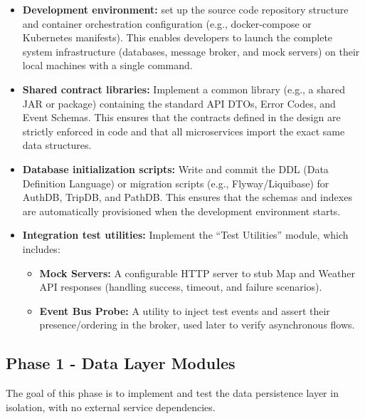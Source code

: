 \begin{itemize}
    \item \textbf{Development environment:} set up the source code repository structure and container orchestration configuration (e.g., docker-compose or Kubernetes manifests). This enables developers to launch the complete system infrastructure (databases, message broker, and mock servers) on their local machines with a single command.
    
    \item \textbf{Shared contract libraries:} Implement a common library (e.g., a shared JAR or package) containing the standard API DTOs, Error Codes, and Event Schemas. This ensures that the contracts defined in the design are strictly enforced in code and that all microservices import the exact same data structures.
    
    \item \textbf{Database initialization scripts:} Write and commit the DDL (Data Definition Language) or migration scripts (e.g., Flyway/Liquibase) for AuthDB, TripDB, and PathDB. This ensures that the schemas and indexes are automatically provisioned when the development environment starts.
    
    \item \textbf{Integration test utilities:} Implement the ``Test Utilities'' module, which includes:
    \begin{itemize}
        \item \textbf{Mock Servers:} A configurable HTTP server to stub Map and Weather API responses (handling success, timeout, and failure scenarios).
        \item \textbf{Event Bus Probe:} A utility to inject test events and assert their presence/ordering in the broker, used later to verify asynchronous flows.
    \end{itemize}
\end{itemize}

\subsection{Phase 1 - Data Layer Modules}
The goal of this phase is to implement and test the data persistence layer in isolation, with no external service dependencies.

